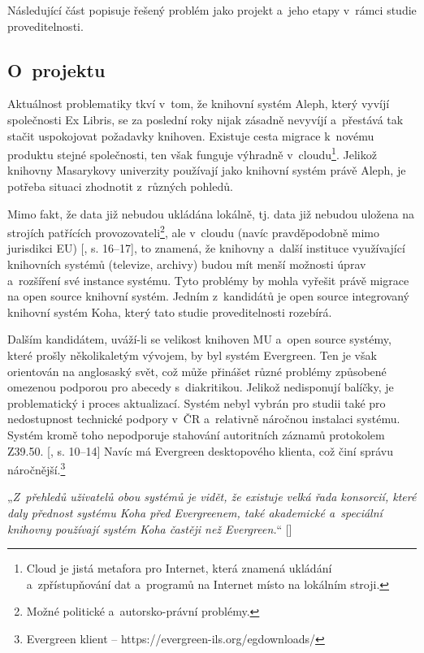 \documentclass[
	11pt, oneside, printed, final, palatino
	microtype,
	table,   %
	lof,     %
	lot     %
]{fithesis3}
\makeatletter
\newcommand{\citepages}[2]{[\cite{#2}, s. #1]}
\newcommand{\citesource}[1]{[\cite{#1}]}
\newcommand{\citace}[1]{„\textit{#1}“} %
\newcommand{\mezera}{\bigskip}
\makeatother
\begin{document}
{Následující část popisuje řešený problém jako projekt a~jeho etapy v~rámci studie proveditelnosti.

\subsection{O~projektu}

Aktuálnost problematiky tkví v~tom, že knihovní systém Aleph, který vyvíjí společnosti Ex Libris, se za poslední roky nijak zásadně nevyvíjí a~přestává tak stačit uspokojovat požadavky knihoven. Existuje cesta migrace k~novému produktu stejné společnosti, ten však funguje výhradně v~cloudu\footnote{Cloud je jistá metafora pro Internet, která znamená ukládání a~zpřístupňování dat a~programů na Internet místo na lokálním stroji.}. Jelikož knihovny Masarykovy univerzity používají jako knihovní systém právě Aleph, je potřeba situaci zhodnotit z~různých pohledů.

Mimo fakt, že data již nebudou ukládána lokálně, tj. data již nebudou uložena na strojích patřících provozovateli\footnote{Možné politické a~autorsko-právní problémy.}, ale v~cloudu (navíc pravděpodobně mimo jurisdikci EU) \citepages{16–17}{breeding_2012}, to znamená, že knihovny a~další instituce využívající knihovních systémů (televize, archivy) budou mít menší možnosti úprav a~rozšíření své instance systému. Tyto problémy by mohla vyřešit právě migrace na open source knihovní systém. Jedním z~kandidátů je open source integrovaný knihovní systém Koha, který tato studie proveditelnosti rozebírá. 

Dalším kandidátem, uváží-li se velikost knihoven MU a~open source systémy, které prošly několikaletým vývojem, by byl systém Evergreen. Ten je však orientován na anglosaský svět, což může přinášet různé problémy způsobené omezenou podporou pro abecedy s~diakritikou. Jelikož nedisponují balíčky, je problematický i proces aktualizací. 
 Systém nebyl vybrán pro studii také pro nedostupnost technické podpory v~ČR a~relativně náročnou instalaci %
  systému. Systém kromě toho nepodporuje stahování autoritních záznamů protokolem Z39.50. \citepages{10–14}{denar_2015}
 Navíc má Evergreen desktopového klienta, což činí správu náročnější.\footnote{Evergreen klient – https://evergreen-ils.org/egdownloads/}
 
 \mezera
 \citace{Z~přehledů uživatelů obou systémů je vidět, že existuje velká řada konsorcií, které daly přednost systému Koha před Evergreenem, také akademické a~speciální knihovny používají systém Koha častěji než Evergreen.} \citesource{zabickova_2014}
 \mezera

}
\end{document}
